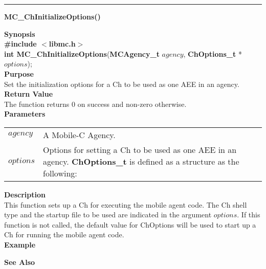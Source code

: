\noindent
\vspace{5pt}
\rule{6.5in}{0.015in}
\noindent
{\LARGE \bf MC\_ChInitializeOptions()}\\
{}

\noindent
{\bf Synopsis}\\
{\bf \#include $<$libmc.h$>$}\\
{\bf int MC\_ChInitializeOptions}({\bf MCAgency\_t} $agency$, {\bf ChOptions\_t} *$options$);\\

\noindent
{\bf Purpose}\\
Set the initialization options for a Ch to be used as one AEE in an agency.\\

\noindent
{\bf Return Value}\\
The function returns 0 on success and non-zero otherwise.\\

\noindent
{\bf Parameters}
\vspace{-0.1in}
\begin{description}
\item
\begin{tabular}{p{10 mm}p{145 mm}}
$agency$ & A Mobile-C Agency.\\
$options$ & Options for setting a Ch to be used as one AEE in an agency. 
{\bf ChOptions\_t} is defined as a structure as the following:

\end{tabular}
\end{description}

\noindent
{\bf Description}\\
This function sets up a Ch for executing the mobile agent code. 
The Ch shell type and the startup file to be used are indicated in the 
argument $options$. 
If this function is not called, the default value for ChOptions will be used 
to start up a Ch for running the mobile agent code.\\

\noindent
{\bf Example}\\
\noindent
{\footnotesize}

\begin{comment}
\begin{verbatim}
MCAgency_t agency;
ChOptions_t ch_options;
ch_options.chhome = malloc(50);
strcpy(ch_options.chhome, "/home/user/");
agency = MC_Initialize(5050, NULL);
MC_ChInitializeOptions(agency, ch_options);

/* Etc... */
\end{verbatim}
\end{comment}
\noindent

\noindent
{\bf See Also}\\

